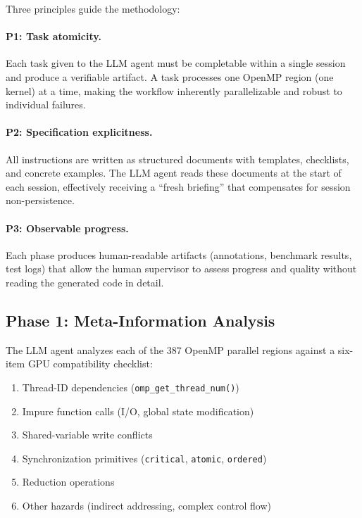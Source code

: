 \documentclass[conference]{IEEEtran}
\begin{document}
Three principles guide the methodology:

\paragraph{P1: Task atomicity.}
Each task given to the LLM agent must be completable within a single session
and produce a verifiable artifact. A task processes one OpenMP region (one
kernel) at a time, making the workflow inherently parallelizable and
robust to individual failures.

\paragraph{P2: Specification explicitness.}
All instructions are written as structured documents with templates,
checklists, and concrete examples. The LLM agent reads these documents at
the start of each session, effectively receiving a ``fresh briefing'' that
compensates for session non-persistence.

\paragraph{P3: Observable progress.}
Each phase produces human-readable artifacts (annotations, benchmark results,
test logs) that allow the human supervisor to assess progress and quality
without reading the generated code in detail.

\subsection{Phase 1: Meta-Information Analysis}

The LLM agent analyzes each of the 387 OpenMP parallel regions against a
six-item GPU compatibility checklist:

\begin{enumerate}
\item Thread-ID dependencies (\texttt{omp\_get\_thread\_num()})
\item Impure function calls (I/O, global state modification)
\item Shared-variable write conflicts
\item Synchronization primitives (\texttt{critical}, \texttt{atomic}, \texttt{ordered})
\item Reduction operations
\item Other hazards (indirect addressing, complex control flow)
\end{enumerate}
\end{document}
